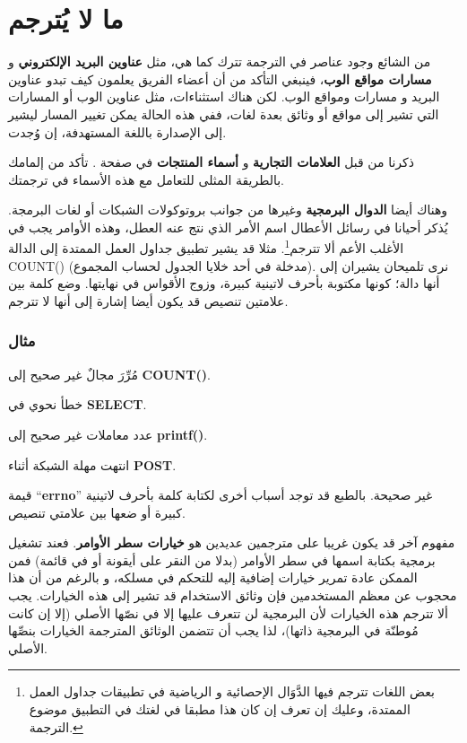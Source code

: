 \section{ما لا يُترجم}
من الشائع وجود عناصر في الترجمة تترك كما هي، مثل {\bf عناوين البريد
الإلكتروني} و {\bf مسارات مواقع الوب}، فينبغي التأكد من أن أعضاء الفريق
يعلمون كيف تبدو عناوين البريد و مسارات ومواقع الوب. لكن هناك استثناءات،
مثل عناوين الوب أو المسارات التي تشير إلى مواقع أو وثائق بعدة لغات، ففي
هذه الحالة يمكن تغيير المسار ليشير إلى الإصدارة باللغة المستهدفة، إن
وُجدت.

ذكرنا من قبل {\bf العلامات التجارية} و {\bf أسماء المنتجات} في صفحة
\at[ref:37296725]. تأكد من إلمامك بالطريقة المثلى للتعامل مع
هذه الأسماء في ترجمتك.

وهناك أيضا {\bf الدوال البرمجية} وغيرها من جوانب بروتوكولات الشبكات أو
لغات البرمجة. يُذكر أحيانا في رسائل الأعطال اسم الأمر الذي نتج عنه
العطل، وهذه الأوامر يجب في الأغلب الأعم ألا تترجم\footnote{بعض اللغات
تترجم فيها الدَّوَال الإحصائية و الرياضية في تطبيقات جداول العمل
الممتدة، وعليك إن تعرف إن كان هذا مطبقا في لغتك في التطبيق موضوع
الترجمة.}. مثلا قد يشير تطبيق جداول العمل الممتدة إلى الدالة ‪COUNT()‬
(مدخلة في أحد خلايا الجدول لحساب المجموع). نرى تلميحان يشيران إلى أنها
دالة؛ كونها مكتوبة بأحرف لاتينية كبيرة، وزوج الأقواس في نهايتها. وضع
كلمة بين علامتين تنصيص قد يكون أيضا إشارة إلى أنها لا تترجم.

\subsubsection{مثال}
\startitemize[1]
\item مُرِّرَ مجالٌ غير صحيح إلى {\bf COUNT()}.
\item خطأ نحوي في {\bf SELECT}.
\item عدد معاملات غير صحيح إلى {\bf printf()}.
\item انتهت مهلة الشبكة أثناء {\bf POST}.
\item قيمة “{\bf errno}” غير صحيحة.
\stopitemize
بالطبع قد توجد أسباب أخرى لكتابة كلمة بأحرف لاتينية كبيرة أو ضعها بين
علامتي تنصيص.

مفهوم آخر قد يكون غريبا على مترجمين عديدين هو {\bf خيارات سطر الأوامر}.
فعند تشغيل برمجية بكتابة اسمها في سطر الأوامر (بدلا من النقر على أيقونة
أو في قائمة) فمن الممكن عادة تمرير خيارات إضافية إليه للتحكم في مسلكه،
و بالرغم من أن هذا محجوب عن معظم المستخدمين فإن وثائق الاستخدام قد تشير
إلى هذه الخيارات. يجب ألا تترجم هذه الخيارات لأن البرمجية لن تتعرف
عليها إلا في نصّها الأصلي (إلا إن كانت مُوطنّة في البرمجية ذاتها)، لذا
يجب أن تتضمن الوثائق المترجمة الخيارات بنصِّها الأصلي.

